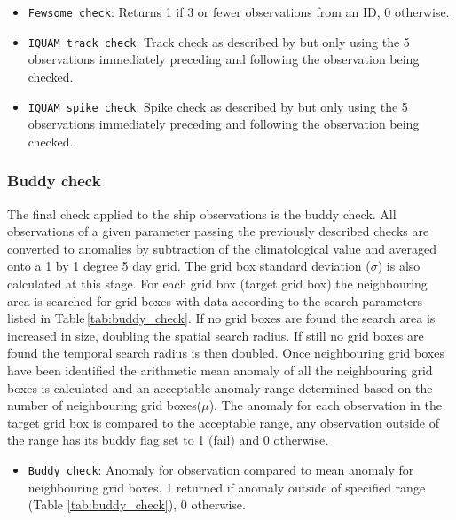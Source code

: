 {\begin{itemize}[resume]
\item \texttt{Fewsome check}: Returns 1 if 3 or fewer observations from an ID, 0 otherwise.
\item \texttt{IQUAM track check}: Track check as described by \cite{Xu2014} but only using the 5 observations immediately preceding and following the observation being checked. 
\item \texttt{IQUAM spike check}: Spike check as described by \cite{Xu2014} but only using the 5 observations immediately preceding and following the observation being checked. 
\end{itemize}

\FloatBarrier
\subsubsection{Buddy check}
The final check applied to the ship observations is the buddy check.  
All observations of a given parameter passing the previously described checks are converted to anomalies by subtraction of the climatological value and averaged onto a 1 by 1 degree 5 day grid. 
The grid box standard deviation ($\sigma$) is also calculated at this stage.
For each grid box (target grid box) the neighbouring area is searched for grid boxes with data according to the search parameters listed in Table\,\ref{tab:buddy_check}.
If no grid boxes are found the search area is increased in size, doubling the spatial search radius.
If still no grid boxes are found the temporal search radius is then doubled.
Once neighbouring grid boxes have been identified the arithmetic mean anomaly of all the neighbouring grid boxes is calculated and an acceptable anomaly range determined based on the number of neighbouring grid boxes($\mu$).
The anomaly for each observation in the target grid box is compared to the acceptable range, any observation outside of the range has its buddy flag set to 1 (fail) and 0 otherwise.
\begin{itemize}[resume]
\item \texttt{Buddy check}: Anomaly for observation compared to mean anomaly for neighbouring grid boxes. 1 returned if anomaly outside of specified range (Table \ref{tab:buddy_check}), 0 otherwise.
\end{itemize}

}
